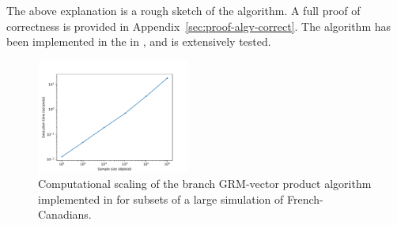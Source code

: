The above explanation is a rough sketch of the algorithm.
A full proof of correctness is provided in Appendix~\ref{sec:proof-algv-correct}.
The algorithm has been implemented in the \tsGRMv{} %
in \tskit{}, and is extensively tested.



\begin{figure}
    \centering
    \includegraphics[width=5cm]{Figures/matvec-benchmark}
    \caption{Computational scaling of the branch GRM-vector product algorithm
    implemented in \tskit{} for subsets of a large simulation 
    of French-Canadians.
    \label{fig:matvec-benchmark}}
\end{figure}

